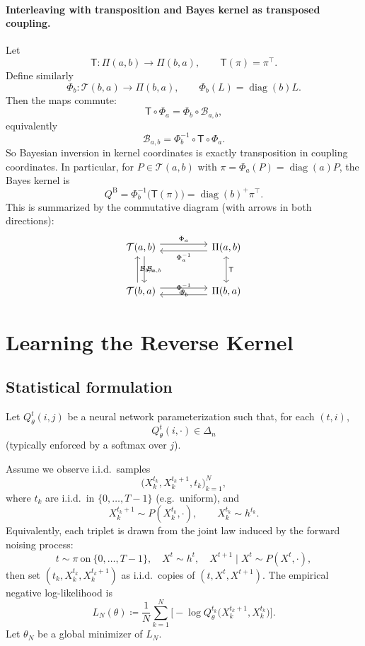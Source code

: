 \documentclass[11pt]{article}
\newcommand{\diag}{\operatorname{diag}}
\newcommand{\Tset}{\mathcal{T}}
\newcommand{\Piset}{\Pi}
\begin{document}
\paragraph{Interleaving with transposition and Bayes kernel as transposed coupling.}
Let
\[
\mathsf T:\Piset(a,b)\to\Piset(b,a),\qquad \mathsf T(\pi)=\pi^\top.
\]
Define similarly
\[
\Phi_b:\Tset(b,a)\to\Piset(b,a),\qquad \Phi_b(L)=\diag(b)L.
\]
Then the maps commute:
\[
\mathsf T\circ \Phi_a=\Phi_b\circ \mathcal B_{a,b},
\]
equivalently
\[
\mathcal B_{a,b}=\Phi_b^{-1}\circ \mathsf T\circ \Phi_a.
\]
So Bayesian inversion in kernel coordinates is exactly transposition in coupling coordinates. In particular, for $P\in\Tset(a,b)$ with $\pi=\Phi_a(P)=\diag(a)P$, the Bayes kernel is
\[
Q^{\mathrm B}=\Phi_b^{-1}\!\big(\mathsf T(\pi)\big)=\diag(b)^+\pi^\top.
\]
This is summarized by the commutative diagram (with arrows in both directions):
\[
\begin{tikzcd}[column sep=huge,row sep=large]
\Tset(a,b)
  \arrow[r,shift left=0.8ex,"\Phi_a"]
  \arrow[d,shift left=0.8ex,"\mathcal B_{a,b}"]
&
\Piset(a,b)
  \arrow[l,shift left=0.8ex,"\Phi_a^{-1}"]
  \arrow[d,leftrightarrow,"\mathsf T"]
\\
\Tset(b,a)
  \arrow[r,shift left=0.8ex,"\Phi_b"']
  \arrow[u,shift left=0.8ex,"\mathcal B_{b,a}"']
&
\Piset(b,a)
  \arrow[l,shift left=0.8ex,"\Phi_b^{-1}"']
\end{tikzcd}
\]

\section{Learning the Reverse Kernel}
\subsection{Statistical formulation}
Let $Q_\theta^t(i,j)$ be a neural network parameterization such that, for each $(t,i)$,
\[
Q_\theta^t(i,\cdot)\in\Delta_n
\]
(typically enforced by a softmax over $j$).

Assume we observe i.i.d.\ samples
\[
\big(X_k^{t_k},X_k^{t_k+1},t_k\big)_{k=1}^N,
\]
where $t_k$ are i.i.d.\ in $\{0,\dots,T-1\}$ (e.g.\ uniform), and
\[
X_k^{t_k+1}\sim P\!\left(X_k^{t_k},\cdot\right),\qquad
X_k^{t_k}\sim h^{t_k}.
\]
Equivalently, each triplet is drawn from the joint law induced by the forward noising process:
\[
t\sim \pi\ \text{on}\ \{0,\dots,T-1\},\quad
X^t\sim h^t,\quad
X^{t+1}\mid X^t\sim P(X^t,\cdot),
\]
then set $(t_k,X_k^{t_k},X_k^{t_k+1})$ as i.i.d.\ copies of $(t,X^t,X^{t+1})$.
The empirical negative log-likelihood is
\begin{equation}
\label{eq:empirical-loss-user}
L_N(\theta)
\coloneqq
\frac1N\sum_{k=1}^N
\Big[-\log Q_\theta^{t_k}\!\big(X_k^{t_k+1},X_k^{t_k}\big)\Big].
\end{equation}
Let $\theta_N$ be a global minimizer of $L_N$.
\end{document}
